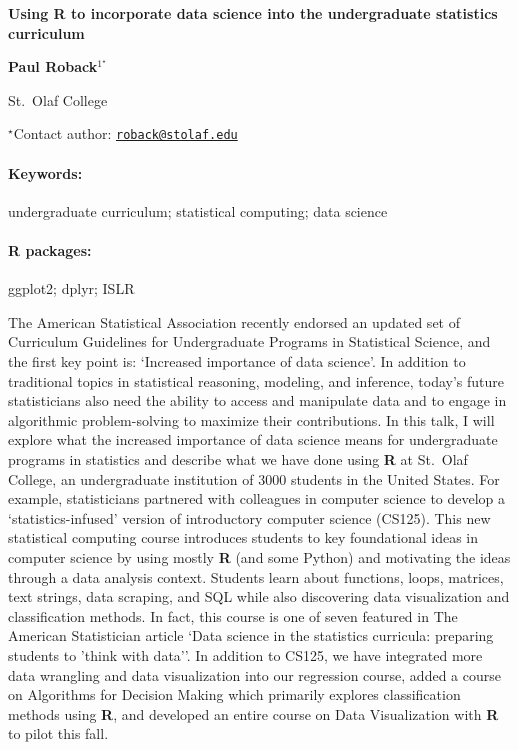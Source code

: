\documentclass[11pt, a4paper]{article}
\renewcommand{\title}[1]{\begin{center}{\bf \LARGE #1}\end{center}}
\newcommand{\keywords}{\paragraph{Keywords:}}
\newcommand{\packages}{\paragraph{R packages:}}
\begin{document}
\pagestyle{empty}

\title{Using R to incorporate data science into the undergraduate statistics
curriculum}

\begin{center}
  {\bf Paul Roback$^{1^\star}$}
\end{center}

\vskip 0.3cm

\begin{affiliations}
\begin{enumerate}
\begin{minipage}{0.915\textwidth}
\centering
\item St.~Olaf College \\[-2pt]
\end{minipage}
\end{enumerate}
$^\star$Contact author: \href{mailto:roback@stolaf.edu}{\nolinkurl{roback@stolaf.edu}}\\
\end{affiliations}

\vskip 0.5cm

\begin{minipage}{0.915\textwidth}
\keywords undergraduate curriculum; statistical computing; data science
\packages ggplot2; dplyr; ISLR
\end{minipage}

\vskip 0.8cm

The American Statistical Association recently endorsed an updated set of
Curriculum Guidelines for Undergraduate Programs in Statistical Science,
and the first key point is: `Increased importance of data science'. In
addition to traditional topics in statistical reasoning, modeling, and
inference, today's future statisticians also need the ability to access
and manipulate data and to engage in algorithmic problem-solving to
maximize their contributions. In this talk, I will explore what the
increased importance of data science means for undergraduate programs in
statistics and describe what we have done using \textbf{R} at St.~Olaf
College, an undergraduate institution of 3000 students in the United
States. For example, statisticians partnered with colleagues in computer
science to develop a `statistics-infused' version of introductory
computer science (CS125). This new statistical computing course
introduces students to key foundational ideas in computer science by
using mostly \textbf{R} (and some Python) and motivating the ideas
through a data analysis context. Students learn about functions, loops,
matrices, text strings, data scraping, and SQL while also discovering
data visualization and classification methods. In fact, this course is
one of seven featured in The American Statistician article `Data science
in the statistics curricula: preparing students to 'think with data''.
In addition to CS125, we have integrated more data wrangling and data
visualization into our regression course, added a course on Algorithms
for Decision Making which primarily explores classification methods
using \textbf{R}, and developed an entire course on Data Visualization
with \textbf{R} to pilot this fall.
\end{document}
